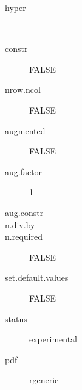 \begin{description}
	\item[hyper]\ 
	\item[constr] FALSE
	\item[nrow.ncol] FALSE
	\item[augmented] FALSE
	\item[aug.factor] 1
	\item[aug.constr] 
	\item[n.div.by] 
	\item[n.required] FALSE
	\item[set.default.values] FALSE
	\item[status] experimental
	\item[pdf] rgeneric
\end{description}
